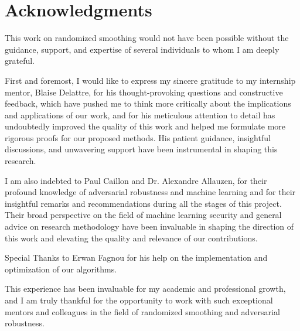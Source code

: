 \section*{Acknowledgments}
This work on randomized smoothing would not have been possible without the guidance, support, and expertise of several individuals to whom I am deeply grateful.

First and foremost, I would like to express my sincere gratitude to my internship mentor, Blaise Delattre, for his thought-provoking questions and constructive feedback, which have pushed me to think more critically about the implications and applications of our work, and for his meticulous attention to detail has undoubtedly improved the quality of this work and helped me formulate more rigorous proofs for our proposed methods.
His patient guidance, insightful discussions, and unwavering support have been instrumental in shaping this research.

I am also indebted to Paul Caillon and Dr. Alexandre Allauzen, for their profound knowledge of adversarial robustness and machine learning and for their insightful remarks and recommendations during all the stages of this project.
Their broad perspective on the field of machine learning security and general advice on research methodology have been invaluable in shaping the direction of this work and elevating the quality and relevance of our contributions.

Special Thanks to Erwan Fagnou for his help on the implementation and optimization of our algorithms.

This experience has been invaluable for my academic and professional growth, and I am truly thankful for the opportunity to work with such exceptional mentors and colleagues in the field of randomized smoothing and adversarial robustness.
